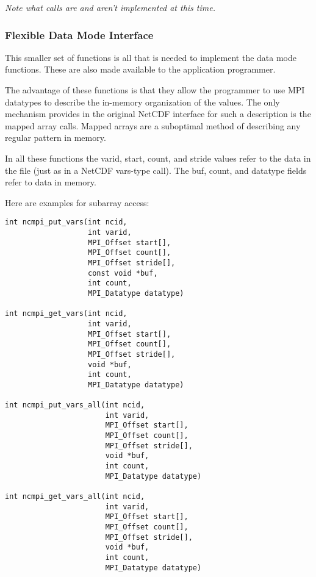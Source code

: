 \documentclass[10pt]{article}
\begin{document}
\emph{Note what calls are and aren't implemented at this time.}

\subsubsection{Flexible Data Mode Interface}

This smaller set of functions is all that is needed to implement the data mode
functions.  These are also made available to the application programmer.

The advantage of these functions is that they allow the programmer to use MPI
datatypes to describe the in-memory organization of the values.  The only
mechanism provides in the original NetCDF interface for such a description is
the mapped array calls.  Mapped arrays are a suboptimal method of describing
any regular pattern in memory.

In all these functions the varid, start, count, and stride values refer to the
data in the file (just as in a NetCDF vars-type call).  The buf, count, and
datatype fields refer to data in memory.

Here are examples for subarray access:
\begin{verbatim}
int ncmpi_put_vars(int ncid,
                   int varid,
                   MPI_Offset start[],
                   MPI_Offset count[],
                   MPI_Offset stride[],
                   const void *buf,
                   int count,
                   MPI_Datatype datatype)

int ncmpi_get_vars(int ncid,
                   int varid,
                   MPI_Offset start[],
                   MPI_Offset count[],
                   MPI_Offset stride[],
                   void *buf,
                   int count,
                   MPI_Datatype datatype)

int ncmpi_put_vars_all(int ncid,
                       int varid,
                       MPI_Offset start[],
                       MPI_Offset count[],
                       MPI_Offset stride[],
                       void *buf,
                       int count,
                       MPI_Datatype datatype)

int ncmpi_get_vars_all(int ncid,
                       int varid,
                       MPI_Offset start[],
                       MPI_Offset count[],
                       MPI_Offset stride[],
                       void *buf,
                       int count,
                       MPI_Datatype datatype)
\end{verbatim}
\end{document}
